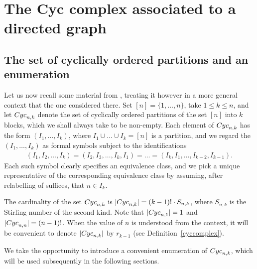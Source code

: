 \documentclass[10pt]{amsart}
\newcommand{\cyc}{\mbox{${\rm Cyc}$}}
\theoremstyle{definition}
\theoremstyle{remark}
\begin{document}
\section{The Cyc complex associated to a directed graph}

\subsection{The set of cyclically ordered partitions and an 
enumeration}\label{thesetcyc}

 Let us now recall some material from \cite[Section~2]{ms},
treating it however in a more general context that the one considered
there. Set $[n]=\{1,\ldots ,n\}$, take $1\leq k\leq n$, and let
$\cyc_{n,k}$ denote the set of cyclically ordered partitions of the
set $[n]$ into $k$ blocks, which we shall always take to be
non-empty. Each element of $\cyc_{n,k}$ has the form $(I_1,\ldots
,I_k)$, where $I_1\cup\ldots\cup I_k=[n]$ is a partition, and we
regard the $(I_1,\ldots ,I_k)$ as formal symbols subject to the
identifications
\begin{eqnarray*}
(I_1,I_2,\ldots ,I_k)=(I_2,I_3,\ldots
  ,I_k,I_1)=\ldots=(I_k,I_1,\ldots,I_{k-2},I_{k-1}).
\end{eqnarray*}
Each such symbol clearly specifies an equivalence class, and we pick a
unique representative of the corresponding equivalence class by
assuming, after relabelling of suffices, that $n\in I_k$.

The cardinality of the set $\cyc_{n,k}$ is $\lvert
\cyc_{n,k}\rvert=(k-1)!\cdot S_{n,k}$, where $S_{n,k}$ is the Stirling
number of the second kind. Note that $\lvert \cyc_{n,1}\rvert=1$ and
$\lvert \cyc_{n,n}\rvert=(n-1)!$. When the value of $n$ is understood
from the context, it will be convenient to denote
$\lvert\cyc_{n,k}\rvert$ by $r_{k-1}$ (see
Definition~\ref{cyccomplex}).

We take the opportunity to introduce a convenient enumeration of
$\cyc_{n,k}$, which will be used subsequently in the following
sections.
\end{document}
